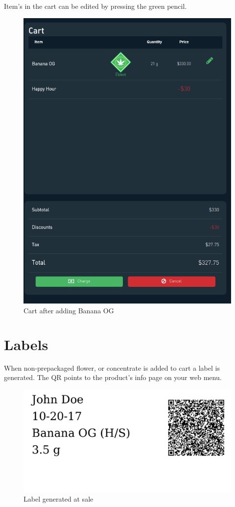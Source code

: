 \documentclass[]{book}
\theoremstyle{definition}
\theoremstyle{definition}
\theoremstyle{definition}
\theoremstyle{remark}
\begin{document}
Item's in the cart can be edited by pressing the green pencil.

\begin{figure}
\centering
\includegraphics{images/P7.png}
\caption{Cart after adding Banana OG}
\end{figure}

\section{Labels}\label{labels-1}

When non-prepackaged flower, or concentrate is added to cart a label is
generated. The QR points to the product's info page on your web menu.

\begin{figure}
\centering
\includegraphics{images/poslabel.png}
\caption{Label generated at sale}
\end{figure}
\end{document}
